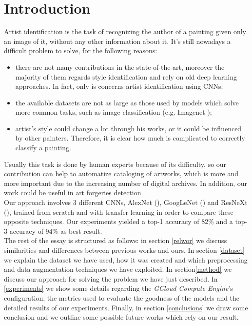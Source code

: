 \documentclass{article}
\begin{document}
\section{Introduction}
Artist identification is the task of recognizing the author of a painting given only an image of it, without any other information about it. It's still nowadays a difficult problem to solve, for the following reasons:
\begin{itemize}
	\item there are not many contributions in the state-of-the-art, moreover the majority of them regards style identification and rely on old deep learning approaches. In fact, only \cite{ArtistIdCNN406} is concerns artist identification using CNNs;
	\item the available datasets are not as large as those used by models which solve more common tasks, such as image classification (e.g. Imagenet \cite{imagenet});
	\item artist's style could change a lot through his works, or it could be influenced by other painters. Therefore, it is clear how much is complicated to correctly classify a painting. 
\end{itemize}
Usually this task is done by human experts because of its difficulty, so our contribution can help to automatize cataloging of artworks, which is more and more important due to the increasing number of  digital archives. In addition, our work could be useful in art forgeries detection.\\
Our approach involves 3 different CNNs, AlexNet (\cite{alexnet}), GoogLeNet (\cite{googlenet}) and ResNeXt (\cite{resneXt}), trained from scratch and with transfer learning in order to compare these opposite techniques. Our experiments yielded a top-1 accuracy of 82\%  and a top-3 accuracy of 94\% as best result.\\


The rest of the essay is structured as follows: in section \ref{relwor} we discuss  similarities and differences between previous works and ours. In section \ref{dataset} we explain the dataset we have used, how it was created and which preprocessing and data augmentation techniques we have exploited. In section\ref{method}
we discuss our approach for solving the problem we have just described. In \ref{experiments} we show some details regarding the \textit{GCloud Compute Engine}'s configuration, the metrics used to evaluate the goodness of the models and the detailed results of our experiments. Finally, in section \ref{conclusions} we draw some conclusion and we outline some possible future works which rely on our result.
\end{document}
